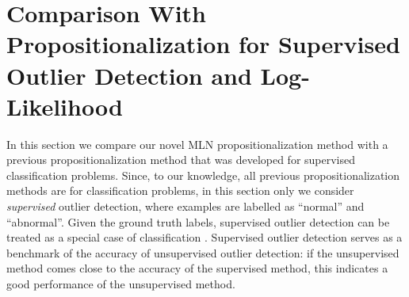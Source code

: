 								
			
			
			
			
%			
%											
%				
%												
%												
%												
					
					
			
			

			\section{Comparison With Propositionalization for Supervised Outlier Detection and Log-Likelihood} 
	
			In this section we compare our novel MLN propositionalization method
			with a previous propositionalization method that was developed for supervised classification problems. Since, to our knowledge, all previous propositionalization methods are for classification problems, in this section only we consider {\em supervised} outlier detection, where examples are labelled as ``normal'' and ``abnormal''. Given the ground truth labels, supervised outlier detection can be treated as a special case of classification \cite{Hodge2004}. Supervised outlier detection serves as a benchmark of the accuracy of unsupervised outlier detection: if the unsupervised method comes close to the accuracy of the supervised method, this indicates a good performance of the unsupervised method. 
			
